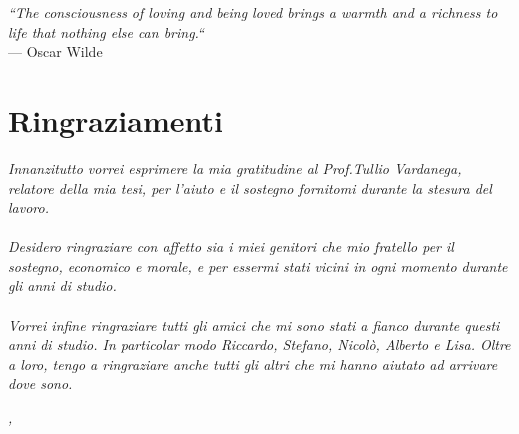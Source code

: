 
\cleardoublepage
{}
{}

\begin{flushright}{
	\slshape    
	``The consciousness of loving and being loved brings a warmth and a richness to life that nothing else can bring.``} \\ 
	\medskip
    --- Oscar Wilde
\end{flushright}


\bigskip

\begingroup
\let\clearpage\relax
\let\cleardoublepage\relax
\let\cleardoublepage\relax

\chapter*{Ringraziamenti}
\textit{Innanzitutto vorrei esprimere la mia gratitudine al Prof.Tullio Vardanega, relatore della mia tesi, per l'aiuto e il sostegno fornitomi durante la stesura del lavoro.}\\
\\
\textit{Desidero ringraziare con affetto sia i miei genitori che mio fratello per il sostegno, economico e morale, e per essermi stati vicini in ogni momento durante gli anni di studio.}\\
\\
\textit{Vorrei infine ringraziare tutti gli amici che mi sono stati a fianco durante questi anni di
studio. In particolar modo Riccardo, Stefano, Nicolò, Alberto e Lisa. Oltre a loro,
tengo a ringraziare anche tutti gli altri che mi hanno aiutato ad arrivare dove sono.}
\bigskip

\noindent\textit{\myLocation, \myTime}
\hfill \myName

\endgroup

